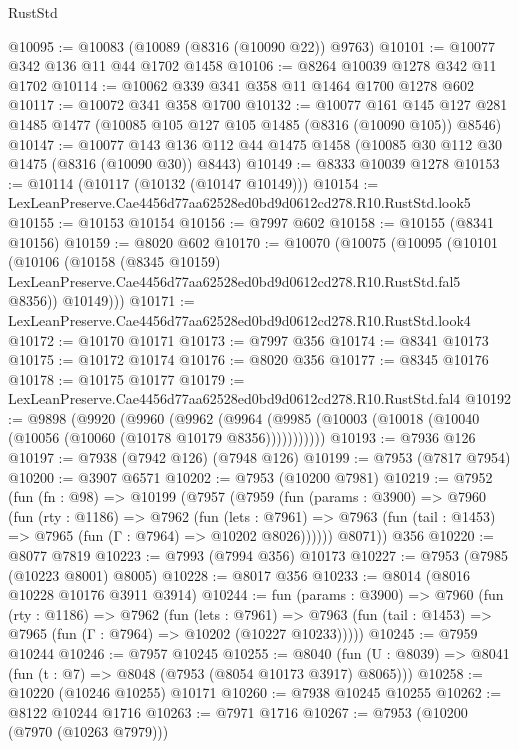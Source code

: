 \begin{lexlean}{RustStd}
\begin{coremodule}
@10095 := @10083 (@10089 (@8316 (@10090 @22)) @9763)
@10101 := @10077 @342 @136 @11 @44 @1702 @1458
@10106 := @8264 @10039 @1278 @342 @11 @1702
@10114 := @10062 @339 @341 @358 @11 @1464 @1700 @1278 @602
@10117 := @10072 @341 @358 @1700
@10132 := @10077
    @161
    @145
    @127
    @281
    @1485
    @1477
    (@10085 @105 @127 @105 @1485 (@8316 (@10090 @105)) @8546)
@10147 := @10077
    @143
    @136
    @112
    @44
    @1475
    @1458
    (@10085 @30 @112 @30 @1475 (@8316 (@10090 @30)) @8443)
@10149 := @8333 @10039 @1278
@10153 := @10114 (@10117 (@10132 (@10147 @10149)))
@10154 := LexLeanPreserve.Cae4456d77aa62528ed0bd9d0612cd278.R10.RustStd.look5
@10155 := @10153 @10154
@10156 := @7997 @602
@10158 := @10155 (@8341 @10156)
@10159 := @8020 @602
@10170 := @10070
    (@10075
      (@10095
        (@10101
          (@10106
            (@10158
              (@8345 @10159)
              LexLeanPreserve.Cae4456d77aa62528ed0bd9d0612cd278.R10.RustStd.fal5
              @8356))
          @10149)))
@10171 := LexLeanPreserve.Cae4456d77aa62528ed0bd9d0612cd278.R10.RustStd.look4
@10172 := @10170 @10171
@10173 := @7997 @356
@10174 := @8341 @10173
@10175 := @10172 @10174
@10176 := @8020 @356
@10177 := @8345 @10176
@10178 := @10175 @10177
@10179 := LexLeanPreserve.Cae4456d77aa62528ed0bd9d0612cd278.R10.RustStd.fal4
@10192 := @9898
    (@9920
      (@9960
        (@9962 (@9964 (@9985 (@10003 (@10018 (@10040 (@10056 (@10060 (@10178 @10179 @8356)))))))))))
@10193 := @7936 @126
@10197 := @7938 (@7942 @126) (@7948 @126)
@10199 := @7953 (@7817 @7954)
@10200 := @3907 @6571
@10202 := @7953 (@10200 @7981)
@10219 := @7952
    (fun (fn : @98) =>
    @10199
      (@7957
        (@7959
          (fun (params : @3900) =>
          @7960
            (fun (rty : @1186) =>
            @7962
              (fun (lets : @7961) =>
              @7963 (fun (tail : @1453) => @7965 (fun (Γ : @7964) => @10202 @8026))))))
        @8071))
    @356
@10220 := @8077 @7819
@10223 := @7993 (@7994 @356) @10173
@10227 := @7953 (@7985 (@10223 @8001) @8005)
@10228 := @8017 @356
@10233 := @8014 (@8016 @10228 @10176 @3911 @3914)
@10244 := fun (params : @3900) =>
  @7960
    (fun (rty : @1186) =>
    @7962
      (fun (lets : @7961) =>
      @7963 (fun (tail : @1453) => @7965 (fun (Γ : @7964) => @10202 (@10227 @10233)))))
@10245 := @7959 @10244
@10246 := @7957 @10245
@10255 := @8040
    (fun (U : @8039) => @8041 (fun (t : @7) => @8048 (@7953 (@8054 @10173 @3917) @8065)))
@10258 := @10220 (@10246 @10255) @10171
@10260 := @7938 @10245 @10255
@10262 := @8122 @10244 @1716
@10263 := @7971 @1716
@10267 := @7953 (@10200 (@7970 (@10263 @7979)))

\end{coremodule}
\end{lexlean}
